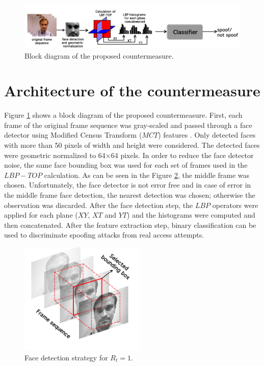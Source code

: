 \begin{figure}[!htb]
\begin{center}
\includegraphics [width=14cm] {images/proposed_countermeasure/countermeasure_2.png}
\caption{Block diagram of the proposed countermeasure.} \label{fig_countermeasure}
\end{center}
\end{figure}

\section{Architecture of the countermeasure}
\label{sec_proposed_counter}

Figure \ref{fig_countermeasure} shows a block diagram of the proposed countermeasure. First, each frame of the original frame sequence was gray-scaled and passed through a face detector using Modified Census Transform ($MCT$) features \cite{froba2004face}. Only detected faces with more than 50 pixels of width and height were considered. The detected faces were geometric normalized to 64$\times$64 pixels. In order to reduce the face detector noise, the same face bounding box was used for each set of frames used in the $LBP-TOP$ calculation. As can be seen in the Figure \ref{fig_faceDetection}, the middle frame was chosen. Unfortunately, the face detector is not error free and in case of error in the middle frame face detection, the nearest detection was chosen; otherwise the observation was discarded. After the face detection step, the $LBP$ operators were applied for each plane ($XY$, $XT$ and $YT$) and the histograms were computed and then concatenated. After the feature extraction step, binary classification can be used to discriminate spoofing attacks from real access attempts.

\begin{figure}[!htb]
\begin{center}
\includegraphics [width=6cm] {images/proposed_countermeasure/faceDetection_2.png}
\caption{Face detection strategy for $R_t = 1$.} \label{fig_faceDetection}
\end{center}
\end{figure}

